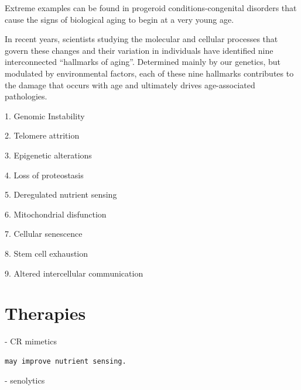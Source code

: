 \documentclass[
]{book}
\begin{document}
Extreme examples can be found in progeroid conditions-congenital disorders that cause the signs of biological aging to begin at a very young age.

In recent years, scientists studying the molecular and cellular processes that govern these changes and their variation in individuals have identified nine interconnected ``hallmarks of aging''. Determined mainly by our genetics, but modulated by environmental factors, each of these nine hallmarks contributes to the damage that occurs with age and ultimately drives age-associated pathologies.

1. Genomic Instability

2. Telomere attrition

3. Epigenetic alterations

4. Loss of proteostasis

5. Deregulated nutrient sensing

6. Mitochondrial disfunction

7. Cellular senescence

8. Stem cell exhaustion

9. Altered intercellular communication

\hypertarget{therapies}{%
\section{Therapies}\label{therapies}}

- CR mimetics

\begin{verbatim}
may improve nutrient sensing.
\end{verbatim}

- senolytics
\end{document}
